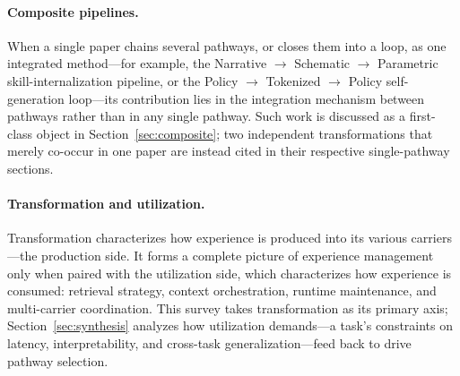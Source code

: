 \paragraph{Composite pipelines.} When a single paper chains several pathways, or closes them into a loop, as one integrated method---for example, the Narrative $\rightarrow$ Schematic $\rightarrow$ Parametric skill-internalization pipeline, or the Policy $\rightarrow$ Tokenized $\rightarrow$ Policy self-generation loop---its contribution lies in the integration mechanism between pathways rather than in any single pathway. Such work is discussed as a first-class object in Section~\ref{sec:composite}; two independent transformations that merely co-occur in one paper are instead cited in their respective single-pathway sections.

\paragraph{Transformation and utilization.} Transformation characterizes how experience is produced into its various carriers---the production side. It forms a complete picture of experience management only when paired with the utilization side, which characterizes how experience is consumed: retrieval strategy, context orchestration, runtime maintenance, and multi-carrier coordination. This survey takes transformation as its primary axis; Section~\ref{sec:synthesis} analyzes how utilization demands---a task's constraints on latency, interpretability, and cross-task generalization---feed back to drive pathway selection.
